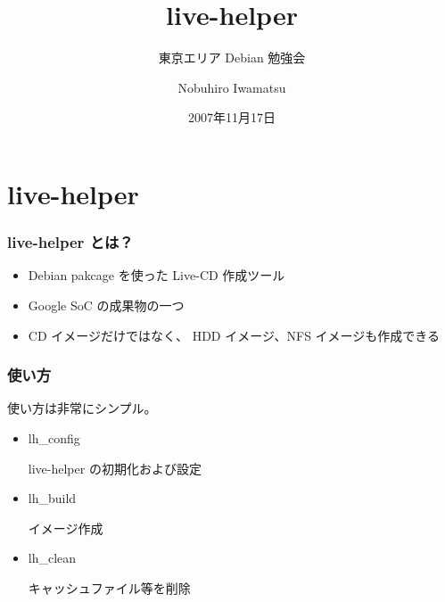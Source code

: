 \documentclass[cjk,dvipdfmx,12pt]{beamer}
\title{live-helper}
\subtitle{東京エリア Debian 勉強会}
\author{Nobuhiro Iwamatsu}
\date{2007年11月17日}
\newenvironment{commandline}%
{\VerbatimEnvironment
  \begin{Sbox}\begin{minipage}{0.9\hsize}\begin{fontsize}{10}{10} \begin{BVerbatim}}%
{\end{BVerbatim}\end{fontsize}\end{minipage}\end{Sbox}
  \setlength{\fboxsep}{8pt}

\vspace{6pt}%
\fcolorbox{dancerdarkblue}{dancerlightblue}{\TheSbox}

\vspace{6pt}%
}
\begin{document}
\frame{\titlepage{}}

\section{live-helper}

\begin{frame}
\frametitle{live-helper とは？}
\begin{itemize}
\item Debian pakcage を使った Live-CD 作成ツール
\item Google SoC の成果物の一つ
\item CD イメージだけではなく、 HDD イメージ、NFS イメージも作成できる
\end{itemize}
\end{frame}



\begin{frame}
\frametitle{使い方}
使い方は非常にシンプル。
\begin{itemize}%
\item<1-> lh\_config

  live-helper の初期化および設定
\item<2-> lh\_build

  イメージ作成

\item<3-> lh\_clean

  キャッシュファイル等を削除
\end{itemize}
\end{frame}
\end{document}
